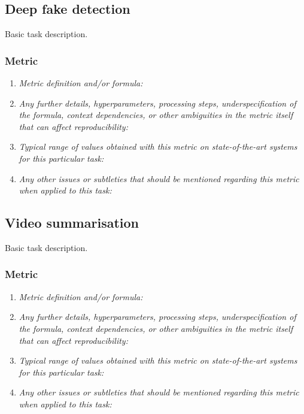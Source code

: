 \documentclass[a4paper,11pt]{article}
\begin{document}
\subsection{Deep fake detection}
    Basic task description.
    \subsubsection{Metric}
        \begin{enumerate}[label=\alph*.]
            \item \textit{Metric definition and/or formula:}
            \bigskip
            \item \textit{Any further details, hyperparameters, processing steps, underspecification of the formula, context dependencies, or other ambiguities in the metric itself that can affect reproducibility:}
            \bigskip
            \item \textit{Typical range of values obtained with this metric on state-of-the-art systems for this particular task:}
            \bigskip
            \item \textit{Any other issues or subtleties that should be mentioned regarding this metric when applied to this task:}
            \bigskip
        \end{enumerate}

\subsection{Video summarisation}
    Basic task description.
    \subsubsection{Metric}
        \begin{enumerate}[label=\alph*.]
            \item \textit{Metric definition and/or formula:}
            \bigskip
            \item \textit{Any further details, hyperparameters, processing steps, underspecification of the formula, context dependencies, or other ambiguities in the metric itself that can affect reproducibility:}
            \bigskip
            \item \textit{Typical range of values obtained with this metric on state-of-the-art systems for this particular task:}
            \bigskip
            \item \textit{Any other issues or subtleties that should be mentioned regarding this metric when applied to this task:}
            \bigskip
        \end{enumerate}
\end{document}
